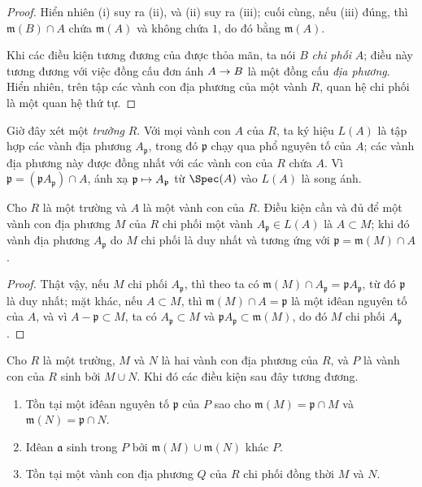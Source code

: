 \documentclass[oneside]{amsart}
\makeatletter
\newcommand{\ega@arrow}[2]{\mathchoice{#1}{#2}{#2}{#2}}
\let\ega@shortmapsto\mapsto
\renewcommand{\to}{\ega@arrow{\longrightarrow}{\rightarrow}}
\renewcommand{\mapsto}{\ega@arrow{\longmapsto}{\ega@shortmapsto}}
\newcommand{\oldpage}[2][]{{\marginnote{\normalfont\textbf{#1}~|~#2}}\ignorespaces}
\let\EGAOriginalLabel\label
\renewcommand{\label}[1]{\phantomsection\EGAOriginalLabel{#1}}
\makeatother
\begin{document}
\begin{proof}
Hiển nhiên (i) suy ra (ii), và (ii) suy ra (iii); cuối cùng, nếu (iii) đúng, thì $\mathfrak{m}(B)\cap A$ chứa $\mathfrak{m}(A)$ và không chứa $1$, do đó bằng $\mathfrak{m}(A)$.

Khi các điều kiện tương đương của  được thỏa mãn, ta nói $B$ \emph{chi phối} $A$; điều này tương đương với việc đồng cấu đơn ánh $A\to B$ là một đồng cấu \emph{địa phương}.
Hiển nhiên, trên tập các vành con địa phương của một vành $R$, quan hệ chi phối là một quan hệ thứ tự.
\end{proof}

\begin{env}[8.1.2]
\label{I.8.1.2}
Giờ đây xét một \emph{trường} $R$.
Với mọi vành con $A$ của $R$, ta ký hiệu $L(A)$ là tập hợp các vành địa phương $A_{\mathfrak{p}}$, trong đó $\mathfrak{p}$ chạy qua phổ nguyên tố của $A$;
các vành địa phương này được đồng nhất với các vành con của $R$ chứa $A$.
Vì $\mathfrak{p}=(\mathfrak{p}A_{\mathfrak{p}})\cap A$, ánh xạ $\mathfrak{p}\mapsto A_{\mathfrak{p}}$ từ $\Spec(A)$ vào $L(A)$ là song ánh.
\end{env}

\begin{lemma}[8.1.3]
\label{I.8.1.3}
Cho $R$ là một trường và $A$ là một vành con của $R$.
Điều kiện cần và đủ để một vành con địa phương $M$ của $R$ chi phối một vành $A_{\mathfrak{p}}\in L(A)$ là $A\subset M$;
khi đó vành địa phương $A_{\mathfrak{p}}$ do $M$ chi phối là duy nhất và tương ứng với $\mathfrak{p}=\mathfrak{m}(M)\cap A$.
\end{lemma}

\begin{proof}
Thật vậy, nếu $M$ chi phối $A_{\mathfrak{p}}$, thì theo  ta có $\mathfrak{m}(M)\cap A_{\mathfrak{p}}=\mathfrak{p}A_{\mathfrak{p}}$, từ đó $\mathfrak{p}$ là duy nhất;
mặt khác, nếu $A\subset M$, thì $\mathfrak{m}(M)\cap A=\mathfrak{p}$ là một iđêan nguyên tố của $A$, và vì $A-\mathfrak{p}\subset M$, ta có $A_{\mathfrak{p}}\subset M$ và $\mathfrak{p}A_{\mathfrak{p}}\subset\mathfrak{m}(M)$, do đó $M$ chi phối $A_{\mathfrak{p}}$.
\end{proof}

\oldpage[I]{165}
\begin{lemma}[8.1.4]
\label{I.8.1.4}
Cho $R$ là một trường, $M$ và $N$ là hai vành con địa phương của $R$, và $P$ là vành con của $R$ sinh bởi $M\cup N$.
Khi đó các điều kiện sau đây tương đương.
\begin{enumerate}
  \item[{\rm(i)}] Tồn tại một iđêan nguyên tố $\mathfrak{p}$ của $P$ sao cho $\mathfrak{m}(M)=\mathfrak{p}\cap M$ và $\mathfrak{m}(N)=\mathfrak{p}\cap N$.
  \item[{\rm(ii)}] Iđêan $\mathfrak{a}$ sinh trong $P$ bởi $\mathfrak{m}(M)\cup\mathfrak{m}(N)$ khác $P$.
  \item[{\rm(iii)}] Tồn tại một vành con địa phương $Q$ của $R$ chi phối đồng thời $M$ và $N$.
\end{enumerate}
\end{lemma}
\end{document}
